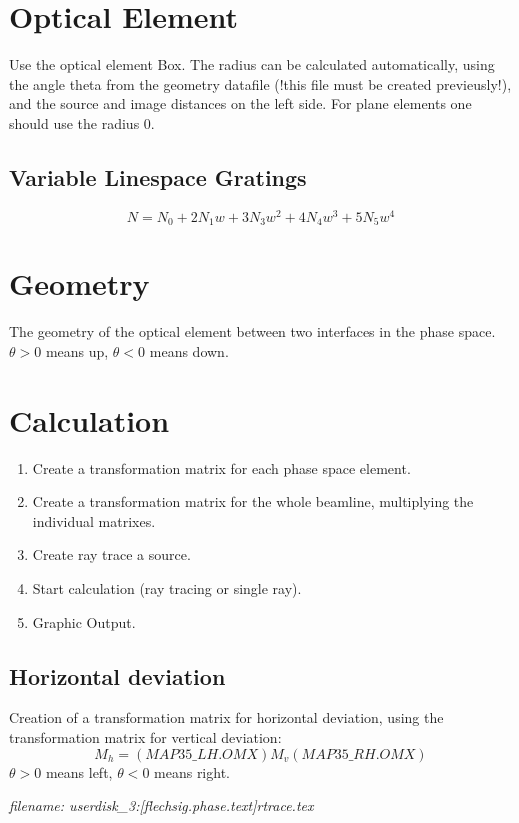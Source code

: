 \section {Optical Element} 
Use the optical element Box. The radius can be calculated automatically, using
the angle theta from the geometry datafile (!this file must be created
previeusly!), and the source and image distances on the left side. For plane
elements one should use the radius 0. 

\subsection {Variable Linespace Gratings}
\[ N = N_0 + 2 N_1 w + 3 N_3 w^2 + 4 N_4 w^3 + 5 N_5 w^4 \]
 
\section {Geometry} 
The geometry of the optical element between two interfaces in the phase space.
$\theta > 0$ means up, $\theta < 0$ means down.


\section {Calculation}
\begin {enumerate} 
\item Create a transformation matrix for each phase space element.
\item Create a transformation matrix for the whole beamline, multiplying the
individual matrixes.
\item Create ray trace a source.
\item Start calculation (ray tracing or single ray).
\item Graphic Output.
\end {enumerate} 

\subsection {Horizontal deviation}
Creation of a transformation matrix for horizontal deviation, using the
transformation matrix for vertical deviation:
\[ M_h= (MAP35\_LH.OMX) M_v (MAP35\_RH.OMX)  \]
$\theta > 0$ means left, $\theta < 0$ means right.
 



{\it filename: userdisk\_3:[flechsig.phase.text]rtrace.tex}     

